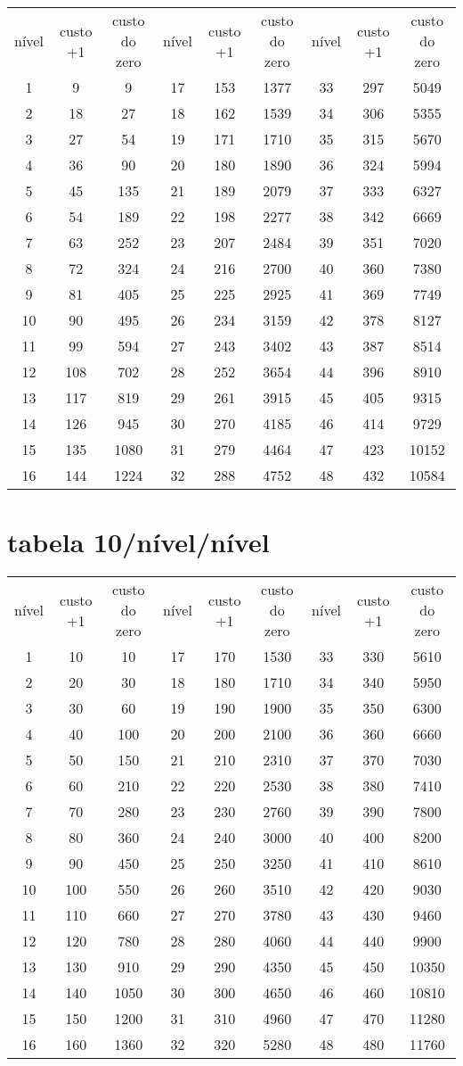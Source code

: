 \begin{longtable}{|c|c|c|c|c|c|c|c|c|}
    nível&custo +1&custo do zero&nível&custo +1&custo do zero&nível&custo +1&custo do zero\tabularnewline 
     1 & 9 & 9 & 17 & 153 & 1377 & 33 & 297 & 5049 \tabularnewline 
     2 & 18 & 27 & 18 & 162 & 1539 & 34 & 306 & 5355 \tabularnewline 
     3 & 27 & 54 & 19 & 171 & 1710 & 35 & 315 & 5670 \tabularnewline 
     4 & 36 & 90 & 20 & 180 & 1890 & 36 & 324 & 5994 \tabularnewline 
     5 & 45 & 135 & 21 & 189 & 2079 & 37 & 333 & 6327 \tabularnewline 
     6 & 54 & 189 & 22 & 198 & 2277 & 38 & 342 & 6669 \tabularnewline 
     7 & 63 & 252 & 23 & 207 & 2484 & 39 & 351 & 7020 \tabularnewline 
     8 & 72 & 324 & 24 & 216 & 2700 & 40 & 360 & 7380 \tabularnewline 
     9 & 81 & 405 & 25 & 225 & 2925 & 41 & 369 & 7749 \tabularnewline 
     10 & 90 & 495 & 26 & 234 & 3159 & 42 & 378 & 8127 \tabularnewline 
     11 & 99 & 594 & 27 & 243 & 3402 & 43 & 387 & 8514 \tabularnewline 
     12 & 108 & 702 & 28 & 252 & 3654 & 44 & 396 & 8910 \tabularnewline 
     13 & 117 & 819 & 29 & 261 & 3915 & 45 & 405 & 9315 \tabularnewline 
     14 & 126 & 945 & 30 & 270 & 4185 & 46 & 414 & 9729 \tabularnewline 
     15 & 135 & 1080 & 31 & 279 & 4464 & 47 & 423 & 10152 \tabularnewline 
     16 & 144 & 1224 & 32 & 288 & 4752 & 48 & 432 & 10584 \tabularnewline  
\end{longtable} \section{tabela 10/nível/nível} 
\begin{longtable}{|c|c|c|c|c|c|c|c|c|}
    nível&custo +1&custo do zero&nível&custo +1&custo do zero&nível&custo +1&custo do zero\tabularnewline 
     1 & 10 & 10 & 17 & 170 & 1530 & 33 & 330 & 5610 \tabularnewline 
     2 & 20 & 30 & 18 & 180 & 1710 & 34 & 340 & 5950 \tabularnewline 
     3 & 30 & 60 & 19 & 190 & 1900 & 35 & 350 & 6300 \tabularnewline 
     4 & 40 & 100 & 20 & 200 & 2100 & 36 & 360 & 6660 \tabularnewline 
     5 & 50 & 150 & 21 & 210 & 2310 & 37 & 370 & 7030 \tabularnewline 
     6 & 60 & 210 & 22 & 220 & 2530 & 38 & 380 & 7410 \tabularnewline 
     7 & 70 & 280 & 23 & 230 & 2760 & 39 & 390 & 7800 \tabularnewline 
     8 & 80 & 360 & 24 & 240 & 3000 & 40 & 400 & 8200 \tabularnewline 
     9 & 90 & 450 & 25 & 250 & 3250 & 41 & 410 & 8610 \tabularnewline 
     10 & 100 & 550 & 26 & 260 & 3510 & 42 & 420 & 9030 \tabularnewline 
     11 & 110 & 660 & 27 & 270 & 3780 & 43 & 430 & 9460 \tabularnewline 
     12 & 120 & 780 & 28 & 280 & 4060 & 44 & 440 & 9900 \tabularnewline 
     13 & 130 & 910 & 29 & 290 & 4350 & 45 & 450 & 10350 \tabularnewline 
     14 & 140 & 1050 & 30 & 300 & 4650 & 46 & 460 & 10810 \tabularnewline 
     15 & 150 & 1200 & 31 & 310 & 4960 & 47 & 470 & 11280 \tabularnewline 
     16 & 160 & 1360 & 32 & 320 & 5280 & 48 & 480 & 11760 \tabularnewline  
\end{longtable} 